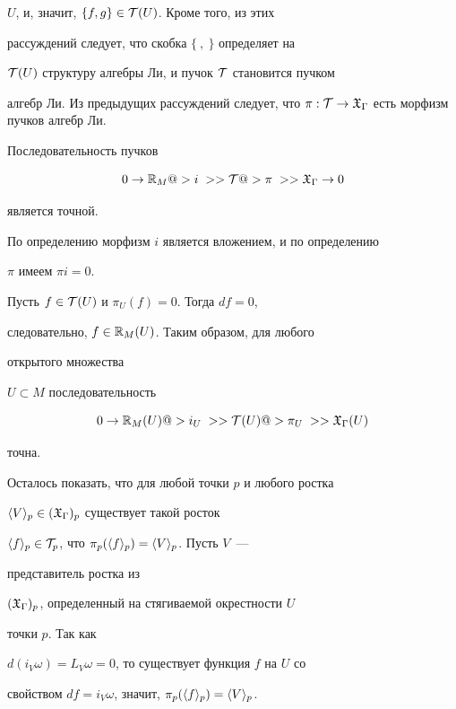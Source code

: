 $U$, и, значит, $\{f,g\} \in {\cal T}(U)$. Кроме того, из этих


рассуждений следует, что скобка $ \{\ ,\ \}$ определяет на


${\cal T}(U)$ структуру алгебры Ли, и пучок ${\cal T}$ становится пучком


алгебр Ли. Из предыдущих рассуждений следует, что $\pi : \cT \to


\gX_\Gamma$ есть морфизм пучков алгебр Ли.








\begin{stat}\label{st1}


Последовательность пучков


$$


0 \to \R_M @>{i\;}>> \cT @>{\pi\;}>> \gX_\Gamma \to 0


$$


является точной.


\end{stat}





\begin{pf}


По определению морфизм $ i$ является вложением, и по определению


$\pi$ имеем $\pi i = 0$.





Пусть $f \in {\cal T}(U)$ и $\pi_U(f)=0$. Тогда $ df=0$,


следовательно, $f \in {\Bbb R}_M(U)$. Таким образом, для любого


открытого множества


$U \subset M$ последовательность


$$


0 \to \R_M(U) @>{i_U\;}>> \cT(U)


@>{\pi_U\;}>> \gX_\Gamma(U)


$$


точна.





Осталось показать, что для любой точки $p$ и любого ростка


$\langle V \rangle_{p} \in ({\frak X}_\Gamma)_p$ существует такой росток


$\germ{f}{p} \in


\cT_p$, что $ \pi_p(\germ{f}{p}) = \germ{V}{p}$. Пусть $V$~---


представитель ростка из


$({\frak X}_\Gamma)_p$, определенный на стягиваемой окрестности  $U$


точки $p$. Так как


$d(i_V\omega) =L_V\omega =0$, то существует функция $f$  на $U$ со


свойством $df = i_V\omega$, значит, $\pi_p(\langle f \rangle_{p}) =\langle V \rangle_{p}$.


\end{pf}





